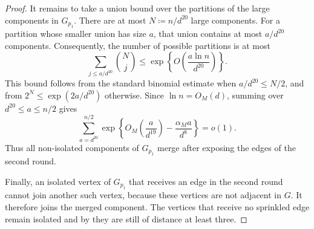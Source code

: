 \documentclass[10pt,a4paper]{amsart}
\begin{document}
\begin{proof}
It remains to take a union bound over the partitions of the large components in $G_{p_1}$. There are at most $N\coloneqq n/d^{20}$ large components.
For a partition whose smaller union has size $a$, that union contains at most $a/d^{20}$ components.
Consequently, the number of possible partitions is at most
\[
  \sum_{j\le a/d^{20}}\binom{N}{j}
  \le \exp\left\{O\left(\frac{a\ln n}{d^{20}}\right)\right\}.
\]
This bound follows from the standard binomial estimate when $a/d^{20}\le N/2$, and from $2^N\le\exp(2a/d^{20})$ otherwise.
Since $\ln n=O_M(d)$, summing over $d^{20}\le a\le n/2$ gives
\[
  \sum_{a=d^{20}}^{n/2}
  \exp\left\{O_M\left(\frac{a}{d^{19}}\right)-\frac{\alpha_Ma}{d^8}\right\}=o(1).
\]
Thus all non-isolated components of $G_{p_1}$ merge after exposing the edges of the second round.

Finally, an isolated vertex of $G_{p_1}$ that receives an edge in the second round cannot join another such vertex, because these vertices are not adjacent in $G$.
It therefore joins the merged component.
The vertices that receive no sprinkled edge remain isolated and by  they are still of distance at least three.
\end{proof}



\end{document}
